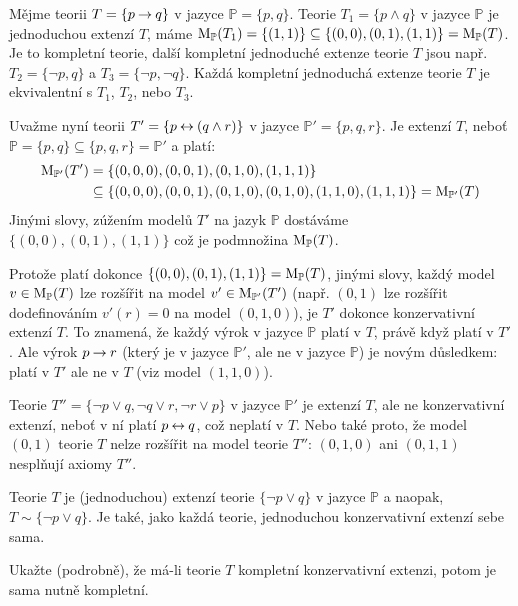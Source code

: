 \begin{example}
Mějme teorii $T=\{p\mathbin{\rightarrow} q\}$ v jazyce $\mathbb P=\{p,q\}$. Teorie $T_1=\{p\land q\}$ v jazyce $\mathbb P$ je jednoduchou extenzí $T$, máme $\operatorname{M}_\mathbb P(T_1)=\{(1,1)\}\subseteq\{(0,0),(0,1),(1,1)\}=\operatorname{M}_\mathbb P(T)$. Je to kompletní teorie, další kompletní jednoduché extenze teorie $T$ jsou např.\ $T_2=\{\neg p,q\}$ a $T_3=\{\neg p,\neg q\}$. Každá kompletní jednoduchá extenze teorie $T$ je ekvivalentní s $T_1$, $T_2$, nebo $T_3$.

Uvažme nyní teorii $T'=\{p\mathbin{\leftrightarrow} (q\land r)\}$ v jazyce $\mathbb P'=\{p,q,r\}$. Je extenzí $T$, neboť $\mathbb P=\{p,q\}\subseteq\{p,q,r\}=\mathbb P'$ a platí:
\begin{align*}
    \operatorname{M}_{\mathbb P'}(T')&=\{(0,0,0),(0,0,1),(0,1,0),(1,1,1)\}\\ 
    &\subseteq\{(0,0,0),(0,0,1),(0,1,0),(0,1,0),(1,1,0),(1,1,1)\}=\operatorname{M}_{\mathbb P'}(T)     
\end{align*}
Jinými slovy, zúžením modelů $T'$ na jazyk $\mathbb P$ dostáváme $\{(0,0),(0,1),(1,1)\}$ což je podmnožina $\operatorname{M}_\mathbb P(T)$. 

Protože platí dokonce $\{(0,0),(0,1),(1,1)\}=\operatorname{M}_\mathbb P(T)$, jinými slovy, každý model $v\in\operatorname{M}_\mathbb P(T)$ lze rozšířit na model $v'\in\operatorname{M}_{\mathbb P'}(T')$ (např. $(0,1)$ lze rozšířit dodefinováním $v'(r)=0$ na model $(0,1,0)$), je $T'$ dokonce konzervativní extenzí $T$. To znamená, že každý výrok v jazyce $\mathbb P$ platí v $T$, právě když platí v $T'$. Ale výrok $p\mathbin{\rightarrow} r$ (který je v jazyce $\mathbb P'$, ale ne v jazyce $\mathbb P$) je novým důsledkem: platí v $T'$ ale ne v $T$ (viz model $(1,1,0)$).

Teorie $T''=\{\neg p\lor q,\neg q\lor r,\neg r\lor p\}$ v jazyce $\mathbb P'$ je extenzí $T$, ale ne konzervativní extenzí, neboť v ní platí $p\mathbin{\leftrightarrow} q$, což neplatí v $T$. Nebo také proto, že model $(0, 1)$ teorie $T$ nelze rozšířit na model teorie $T''$: $(0,1,0)$ ani $(0,1,1)$ nesplňují axiomy $T''$.

Teorie $T$ je (jednoduchou) extenzí teorie $\{\neg p\lor q\}$ v jazyce $\mathbb P$ a naopak, $T\sim\{\neg p\lor q\}$. Je také, jako každá teorie, jednoduchou konzervativní extenzí sebe sama.
\end{example}

\begin{exercise}
    Ukažte (podrobně), že má-li teorie $T$ kompletní konzervativní extenzi, potom je sama nutně kompletní.
\end{exercise}

